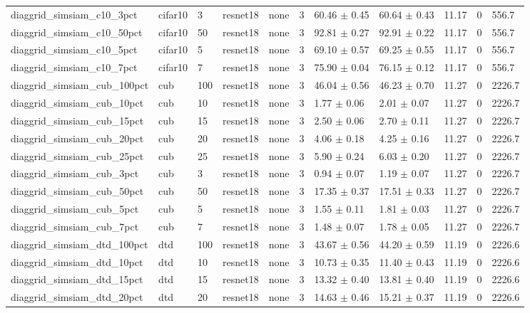 \begin{tabular}{lllllllllll}
diaggrid_simsiam_c10_3pct & cifar10 & 3 & resnet18 & none & 3 & 60.46 $\pm$ 0.45 & 60.64 $\pm$ 0.43 & 11.17 & 0 & 556.7 \\
diaggrid_simsiam_c10_50pct & cifar10 & 50 & resnet18 & none & 3 & 92.81 $\pm$ 0.27 & 92.91 $\pm$ 0.22 & 11.17 & 0 & 556.7 \\
diaggrid_simsiam_c10_5pct & cifar10 & 5 & resnet18 & none & 3 & 69.10 $\pm$ 0.57 & 69.25 $\pm$ 0.55 & 11.17 & 0 & 556.7 \\
diaggrid_simsiam_c10_7pct & cifar10 & 7 & resnet18 & none & 3 & 75.90 $\pm$ 0.04 & 76.15 $\pm$ 0.12 & 11.17 & 0 & 556.7 \\
diaggrid_simsiam_cub_100pct & cub & 100 & resnet18 & none & 3 & 46.04 $\pm$ 0.56 & 46.23 $\pm$ 0.70 & 11.27 & 0 & 2226.7 \\
diaggrid_simsiam_cub_10pct & cub & 10 & resnet18 & none & 3 & 1.77 $\pm$ 0.06 & 2.01 $\pm$ 0.07 & 11.27 & 0 & 2226.7 \\
diaggrid_simsiam_cub_15pct & cub & 15 & resnet18 & none & 3 & 2.50 $\pm$ 0.06 & 2.70 $\pm$ 0.11 & 11.27 & 0 & 2226.7 \\
diaggrid_simsiam_cub_20pct & cub & 20 & resnet18 & none & 3 & 4.06 $\pm$ 0.18 & 4.25 $\pm$ 0.16 & 11.27 & 0 & 2226.7 \\
diaggrid_simsiam_cub_25pct & cub & 25 & resnet18 & none & 3 & 5.90 $\pm$ 0.24 & 6.03 $\pm$ 0.20 & 11.27 & 0 & 2226.7 \\
diaggrid_simsiam_cub_3pct & cub & 3 & resnet18 & none & 3 & 0.94 $\pm$ 0.07 & 1.19 $\pm$ 0.07 & 11.27 & 0 & 2226.7 \\
diaggrid_simsiam_cub_50pct & cub & 50 & resnet18 & none & 3 & 17.35 $\pm$ 0.37 & 17.51 $\pm$ 0.33 & 11.27 & 0 & 2226.7 \\
diaggrid_simsiam_cub_5pct & cub & 5 & resnet18 & none & 3 & 1.55 $\pm$ 0.11 & 1.81 $\pm$ 0.03 & 11.27 & 0 & 2226.7 \\
diaggrid_simsiam_cub_7pct & cub & 7 & resnet18 & none & 3 & 1.48 $\pm$ 0.07 & 1.78 $\pm$ 0.05 & 11.27 & 0 & 2226.7 \\
diaggrid_simsiam_dtd_100pct & dtd & 100 & resnet18 & none & 3 & 43.67 $\pm$ 0.56 & 44.20 $\pm$ 0.59 & 11.19 & 0 & 2226.6 \\
diaggrid_simsiam_dtd_10pct & dtd & 10 & resnet18 & none & 3 & 10.73 $\pm$ 0.35 & 11.40 $\pm$ 0.43 & 11.19 & 0 & 2226.6 \\
diaggrid_simsiam_dtd_15pct & dtd & 15 & resnet18 & none & 3 & 13.32 $\pm$ 0.40 & 13.81 $\pm$ 0.40 & 11.19 & 0 & 2226.6 \\
diaggrid_simsiam_dtd_20pct & dtd & 20 & resnet18 & none & 3 & 14.63 $\pm$ 0.46 & 15.21 $\pm$ 0.37 & 11.19 & 0 & 2226.6 \\

\end{tabular}
